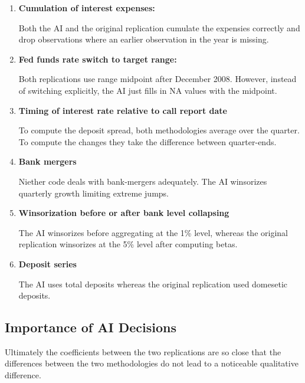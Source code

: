 \documentclass[11pt]{article}
\begin{document}
\begin{enumerate}[label=\textbf{(\alph*)}, leftmargin=*, itemsep=2\baselineskip]
    \item \textbf{Cumulation of interest expenses:}

    Both the AI and the original replication cumulate the expensies correctly and drop observations where an earlier observation in the year is missing.

    \item \textbf{Fed funds rate switch to target range:}

    Both replications use range midpoint after December 2008. However, instead of switching explicitly, the AI just fills in NA values with the midpoint.

    \item \textbf{Timing of interest rate relative to call report date}

    To compute the deposit spread, both methodologies average over the quarter. To compute the changes they take the difference between quarter-ends.

    \item \textbf{Bank mergers}

    Niether code deals with bank-mergers adequately. The AI winsorizes quarterly growth limiting extreme jumps.

    \item \textbf{Winsorization before or after bank level collapsing}

    The AI winsorizes before aggregating at the 1\% level, whereas the original replication winsorizes at the 5\% level after computing betas.

    \item \textbf{Deposit series}

    The AI uses total deposits whereas the original replication used domesetic deposits.

\end{enumerate}


\subsection{Importance of AI Decisions}

Ultimately the coefficients between the two replications are so close that the differences between the two methodologies do not lead to a noticeable qualitative difference.
\end{document}

